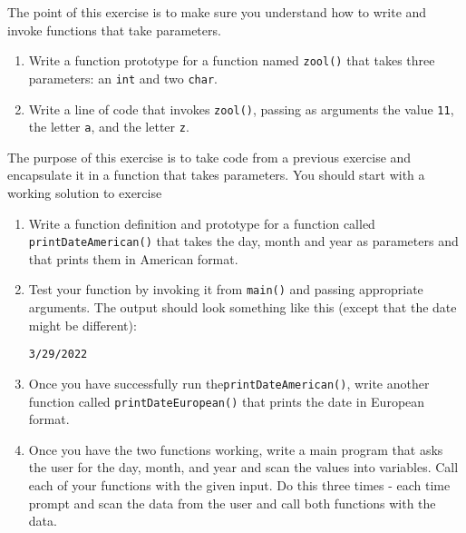 
\begin{exercise}
The point of this exercise is to make sure you understand how
to write and invoke functions that take parameters.

\begin{enumerate}

\item Write a function prototype for a function named {\tt zool()} that
takes three parameters: an {\tt int} and two {\tt char}.

\item Write a line of code that invokes {\tt zool()}, passing
as arguments the value {\tt 11}, the letter {\tt a}, and the letter {\tt z}.
\end{enumerate}


\end{exercise}



\begin{exercise}

The purpose of this exercise is to take code from a previous exercise
and encapsulate it in a function that takes parameters.  You should
start with a working solution to exercise

\begin{enumerate}

\item Write a function definition and prototype for a function called {\tt printDateAmerican()}
that takes the day, month and year as parameters and that
prints them in American format.

\item Test your function by invoking it from {\tt main()} and passing
appropriate arguments.  The output should look something like this
(except that the date might be different):
%
\begin{verbatim}
3/29/2022
\end{verbatim}
%
\item Once you have successfully run the{\tt printDateAmerican()}, write another
function called {\tt printDateEuropean()} that prints the date in
European format.

\item Once you have the two functions working, write a main program that asks the user for the day, month, and year and scan the values into variables.
Call each of your functions with the given input. Do this three times - each time prompt and scan the data from the user and call both functions with the data.

\end{enumerate}

\end{exercise}


